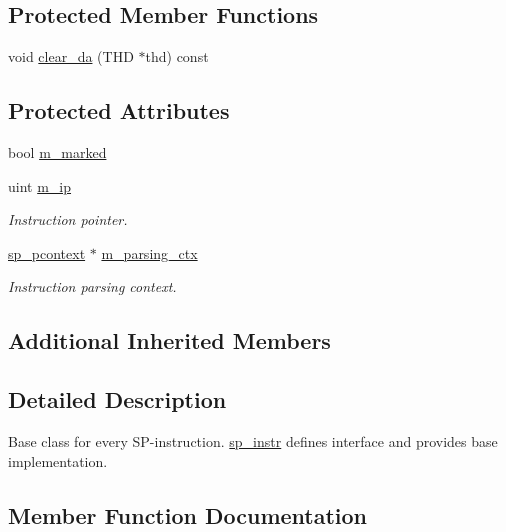 \subsection*{Protected Member Functions}
\begin{DoxyCompactItemize}
\item 
void \mbox{\hyperlink{classsp__instr_a2ebb68d93e4acbc0c814bcbc7ded3e54}{clear\+\_\+da}} (T\+HD $\ast$thd) const
\end{DoxyCompactItemize}
\subsection*{Protected Attributes}
\begin{DoxyCompactItemize}
\item 
bool \mbox{\hyperlink{classsp__instr_a03665ad69f89c9ad7117228d54258e99}{m\+\_\+marked}}
\item 
\mbox{\label{classsp__instr_a8b6472d6fc4a4b2b1db6a63c181f328f}} 
uint \mbox{\hyperlink{classsp__instr_a8b6472d6fc4a4b2b1db6a63c181f328f}{m\+\_\+ip}}
\begin{DoxyCompactList}\small\item\em Instruction pointer. \end{DoxyCompactList}\item 
\mbox{\label{classsp__instr_a0f1fa83e9a7308d9eade4a89793b94ff}} 
\mbox{\hyperlink{classsp__pcontext}{sp\+\_\+pcontext}} $\ast$ \mbox{\hyperlink{classsp__instr_a0f1fa83e9a7308d9eade4a89793b94ff}{m\+\_\+parsing\+\_\+ctx}}
\begin{DoxyCompactList}\small\item\em Instruction parsing context. \end{DoxyCompactList}\end{DoxyCompactItemize}
\subsection*{Additional Inherited Members}


\subsection{Detailed Description}
Base class for every SP-\/instruction. \mbox{\hyperlink{classsp__instr}{sp\+\_\+instr}} defines interface and provides base implementation. 

\subsection{Member Function Documentation}
\mbox{\label{classsp__instr_a2ebb68d93e4acbc0c814bcbc7ded3e54}} 
